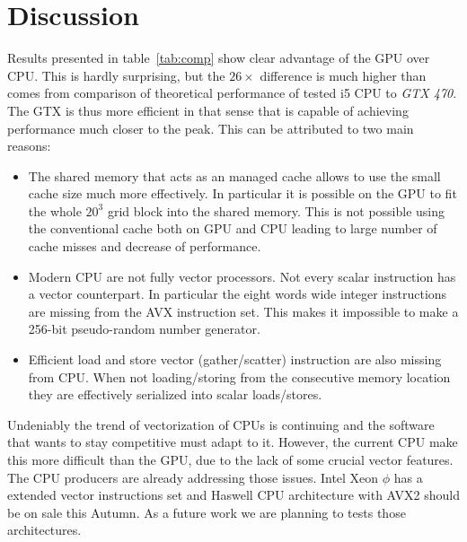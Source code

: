 \documentclass[a4paper]{llncs}
\begin{document}
\section{Discussion}

Results presented in table~\ref{tab:comp} show clear advantage of the
GPU over CPU. This is hardly surprising, but the $26\times$ difference
is much higher than comes from comparison of theoretical performance of
tested i5 CPU to \emph{GTX 470}. The GTX is thus more efficient in
that sense that is capable of achieving performance much closer to the
peak. This can be attributed to two main reasons:
\begin{itemize}
\item The shared memory that acts as an managed cache allows to use
  the small cache size much more effectively. In particular it is
  possible on the GPU to fit the whole $20^3$ grid block into the
  shared memory. This is not possible using the conventional cache
  both on GPU and CPU leading to large number of cache misses and
  decrease of performance. 
\item Modern CPU are not fully vector processors. Not every scalar
  instruction has a vector counterpart. In particular the eight words
  wide integer instructions are missing from the AVX instruction set.
  This makes it impossible to make a 256-bit pseudo-random number
  generator.
\item Efficient load and store vector (gather/scatter) instruction are
  also missing from CPU.  When not loading/storing from the
  consecutive memory location they are effectively serialized into
  scalar loads/stores.
\end{itemize}

Undeniably the trend of vectorization of CPUs is continuing and the
software that wants to stay competitive must adapt to it.  However, the
current CPU make this more difficult than the GPU, due to the lack of
some crucial vector features.  The CPU producers are already
addressing those issues. Intel Xeon $\phi$ has a extended vector
instructions set and Haswell CPU architecture with AVX2 should be on
sale this Autumn. As a future work we are planning to tests those
architectures.
\end{document}
